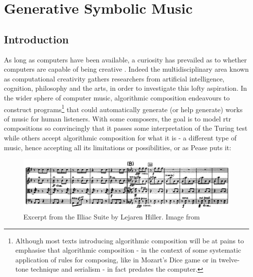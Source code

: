 \chapter{Generative Symbolic Music}
\label{chap:symbolic}

\section{Introduction}

As long as computers have been available, a curiosity has prevailed as to whether computers are capable of being creative \citep{Cardoso2009}. Indeed the multidisciplinary area known as computational creativity \citep{Wiggins2006, Colton2012} gathers researchers from artificial intelligence, cognition, philosophy and the arts, in order to investigate this lofty aspiration. In the wider sphere of computer music, algorithmic composition \citep{Jacob1996, Fernandez2013} endeavours to construct programs\footnote{Although most texts introducing algorithmic composition will be at pains to emphasise that algorithmic composition - in the context of some systematic application of rules for composing, like in Mozart's Dice game or in twelve-tone technique and serialism - in fact predates the computer.} that could automatically generate (or help generate) works of music for human listeners. With some composers, the goal is to model rtr compositions \citep{Cope1987, Cope1991} so convincingly that it passes some interpretation of the Turing test \citep{Ariza2009} while others accept algorithmic composition for what it is - a different type of music, hence accepting all its limitations or possibilities, or as Pease puts it:

\begin{figure}
	\begin{center}
		\includegraphics[width=\figSizeHundred]{ch03_symbolic/figures/illiac.jpg}
	\end{center}
	\caption[Excerpt from the Illiac Suite (Lejaren Hiller)]{Excerpt from the Illiac Suite by Lejaren Hiller. Image from \cite{Morgan2015}}
	\label{fig:illiac}
\end{figure}

